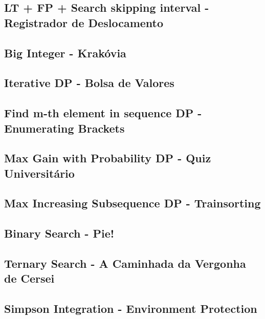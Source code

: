 \documentclass[11pt, a4paper, twoside, notitlepage]{article}
\begin{document}
\subsection{LT + FP + Search skipping interval - Registrador de Deslocamento}



\subsection{Big Integer - Krakóvia}



\subsection{Iterative DP - Bolsa de Valores}



\subsection{Find m-th element in sequence DP - Enumerating Brackets}



\subsection{Max Gain with Probability DP - Quiz Universitário}



\subsection{Max Increasing Subsequence DP - Trainsorting}



\subsection{Binary Search - Pie!}



\subsection{Ternary Search - A Caminhada da Vergonha de Cersei}



\subsection{Simpson Integration - Environment Protection}



\newpage
\end{document}
